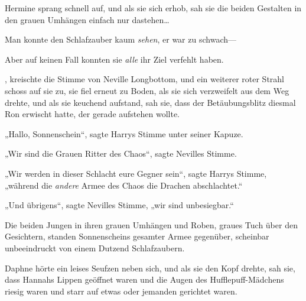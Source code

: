 Hermine sprang schnell auf, und als sie sich erhob, sah sie die beiden Gestalten in den grauen Umhängen einfach nur dastehen…

Man konnte den Schlafzauber kaum \emph{sehen}, er war zu schwach—

Aber auf keinen Fall konnten sie \emph{alle} ihr Ziel verfehlt haben.

, kreischte die Stimme von Neville Longbottom, und ein weiterer roter Strahl schoss auf sie zu, sie fiel erneut zu Boden, als sie sich verzweifelt aus dem Weg drehte, und als sie keuchend aufstand, sah sie, dass der Betäubungsblitz diesmal Ron erwischt hatte, der gerade aufstehen wollte.

„Hallo, Sonnenschein“, sagte Harrys Stimme unter seiner Kapuze.

„Wir sind die Grauen Ritter des Chaos“, sagte Nevilles Stimme.

„Wir werden in dieser Schlacht eure Gegner sein“, sagte Harrys Stimme, „während die \emph{andere} Armee des Chaos die Drachen abschlachtet.“

„Und übrigens“, sagte Nevilles Stimme, „wir sind unbesiegbar.“

\later

Die beiden Jungen in ihren grauen Umhängen und Roben, graues Tuch über den Gesichtern, standen Sonnenscheins gesamter Armee gegenüber, scheinbar unbeeindruckt von einem Dutzend Schlafzaubern.

Daphne hörte ein leises Seufzen neben sich, und als sie den Kopf drehte, sah sie, dass Hannahs Lippen geöffnet waren und die Augen des Hufflepuff-Mädchens riesig waren und starr auf etwas oder jemanden gerichtet waren.

